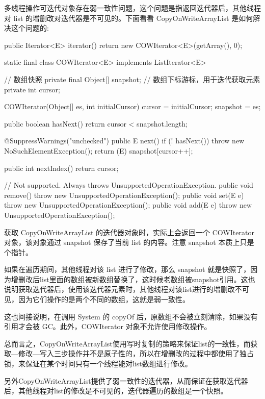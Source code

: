 多线程操作可迭代对象存在弱一致性问题，这个问题是指返回迭代器后，其他线程对 list 的增删改对迭代器是不可见的。下面看看 CopyOnWriteArrayList 是如何解决这个问题的:

\begin{Java}
public Iterator<E> iterator() {
    return new COWIterator<E>(getArray(), 0);
}

static final class COWIterator<E> implements ListIterator<E> {
    // 数组快照
    private final Object[] snapshot;
    // 数组下标游标，用于迭代获取元素
    private int cursor;

    COWIterator(Object[] es, int initialCursor) {
        cursor = initialCursor;
        snapshot = es;
    }

    public boolean hasNext() {
        return cursor < snapshot.length;
    }

    @SuppressWarnings("unchecked")
    public E next() {
        if (! hasNext())
            throw new NoSuchElementException();
        return (E) snapshot[cursor++];
    }

    public int nextIndex() {
        return cursor;
    }

    // Not supported. Always throws UnsupportedOperationException.
    public void remove() {
        throw new UnsupportedOperationException();
    }
    public void set(E e) {
        throw new UnsupportedOperationException();
    }
    public void add(E e) {
        throw new UnsupportedOperationException();
    }
}
\end{Java}

获取 CopyOnWriteArrayList 的迭代器对象时，实际上会返回一个 COWIterator 对象，该对象通过 snapshot 保存了当前 list 的内容。注意 snapshot 本质上只是个指针。

如果在遍历期间，其他线程对该 list 进行了修改，那么 snapshot 就是快照了，因为增删改后list里面的数组被新数组替换了，这时候老数组被snapshot引用。这也说明获取迭代器后，使用该迭代器元素时，其他线程对该list进行的增删改不可见，因为它们操作的是两个不同的数组，这就是弱一致性。

这也间接说明，在调用 System 的 copyOf 后，原数组不会被立刻清除，如果没有引用才会被 GC。此外，COWIterator 对象不允许使用修改操作。

总而言之，CopyOnWriteArrayList使用写时复制的策略来保证list的一致性，而获取—修改—写入三步操作并不是原子性的，所以在增删改的过程中都使用了独占锁，来保证在某个时间只有一个线程能对list数组进行修改。

另外CopyOnWriteArrayList提供了弱一致性的迭代器，从而保证在获取迭代器后，其他线程对list的修改是不可见的，迭代器遍历的数组是一个快照。


